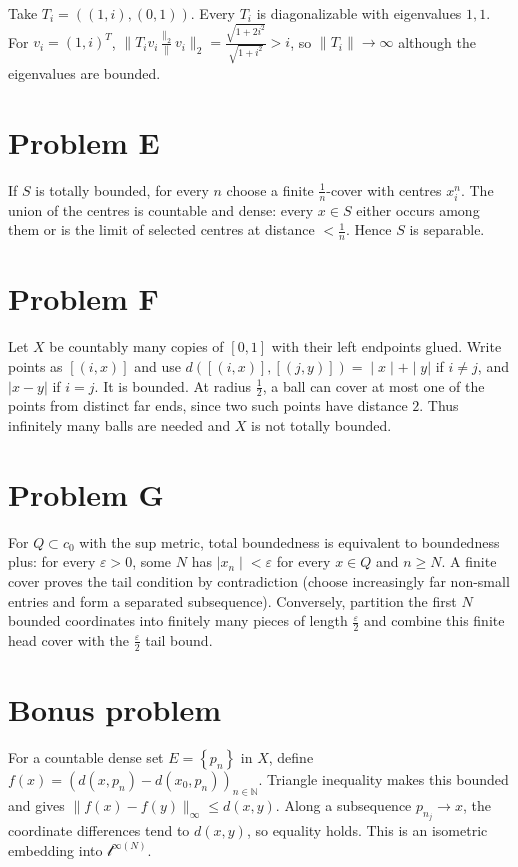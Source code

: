 Take \(T_{i} = \left( {\left( {1,i} \right),\left( {0,1} \right)} \right)\). Every \(T_{i}\) is diagonalizable with eigenvalues \(1,1\). For \(v_{i} = \left( {1,i} \right)^{T}\), \(\| T_{i}v_{i}\frac{\|_{2}}{\|}v_{i}\|_{2} = \frac{\sqrt{1 + 2i^{2}}}{\sqrt{1 + i^{2}}} > i\), so \(\| T_{i}\|\rightarrow\infty\) although the eigenvalues are bounded.

\section{Problem E}

If \(S\) is totally bounded, for every \(n\) choose a finite \(\frac{1}{n}\)-cover with centres \(x_{i}^{n}\). The union of the centres is countable and dense: every \(x \in S\) either occurs among them or is the limit of selected centres at distance \(< \frac{1}{n}\). Hence \(S\) is separable.

\section{Problem F}

Let \(X\) be countably many copies of \(\left\lbrack {0,1} \right\rbrack\) with their left endpoints glued. Write points as \(\left\lbrack \left( {i,x} \right) \right\rbrack\) and use \(\left. d\left( {\left\lbrack \left( {i,x} \right) \right\rbrack,\left\lbrack \left( {j,y} \right) \right\rbrack} \right) = \middle| x \middle| + \middle| y| \right.\) if \(i \neq j\), and \(|x - y|\) if \(i = j\). It is bounded. At radius \(\frac{1}{2}\), a ball can cover at most one of the points from distinct far ends, since two such points have distance \(2\). Thus infinitely many balls are needed and \(X\) is not totally bounded.

\section{Problem G}

For \(Q \subset c_{0}\) with the sup metric, total boundedness is equivalent to boundedness plus: for every \(\varepsilon > 0\), some \(N\) has \(\left. |x_{n} \middle| < \varepsilon \right.\) for every \(x \in Q\) and \(n \geq N\). A finite cover proves the tail condition by contradiction (choose increasingly far non-small entries and form a separated subsequence). Conversely, partition the first \(N\) bounded coordinates into finitely many pieces of length \(\frac{\varepsilon}{2}\) and combine this finite head cover with the \(\frac{\varepsilon}{2}\) tail bound.

\section{Bonus problem}

For a countable dense set \(E = \left\{ p_{n} \right\}\) in \(X\), define \(f(x) = \left( {d\left( {x,p_{n}} \right) - d\left( {x_{0},p_{n}} \right)} \right)_{n \in \mathbb{N}}\). Triangle inequality makes this bounded and gives \(\| f(x) - f(y)\|_{\infty} \leq d\left( {x,y} \right)\). Along a subsequence \(p_{n_{j}}\rightarrow x\), the coordinate differences tend to \(d\left( {x,y} \right)\), so equality holds. This is an isometric embedding into \(\mathcal{l}^{\infty{(N)}}\).
